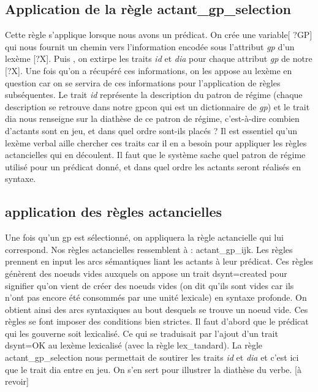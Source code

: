 \subsection{Application de la règle actant{\_}gp{\_}selection}
Cette règle s'applique lorsque nous avons un prédicat.
On crée une variable[ ?GP] qui nous fournit un chemin vers l'information encodée sous l'attribut \emph{ gp} d'un lexème [?X]. Puis , on extirpe les traits \emph{ id} et \emph{dia} pour chaque attribut\emph{ gp} de notre [?X]. Une fois qu'on a récupéré ces informations, on les appose au lexème en question car on se servira de ces informations pour l'application de règles subséquentes. Le trait \emph{ id} représente la description du patron de régime (chaque description se retrouve dans notre gpcon qui est un dictionnaire de\emph{ gp}) et le trait dia nous renseigne sur la diathèse de ce patron de régime, c'est-à-dire combien d'actants sont en jeu, et dans quel ordre sont-ils placés ? Il est essentiel qu'un lexème verbal aille chercher ces traits car il en a besoin pour appliquer les règles actancielles qui en découlent. Il faut que le système sache quel patron de régime utilisé pour un prédicat donné, et dans quel ordre les actants seront réalisés en syntaxe.

\subsection{application des règles actancielles}
Une fois qu'un gp est sélectionné, on appliquera la règle actancielle qui lui correspond. Nos règles actancielles ressemblent à : actant{\_}gp{\_}ijk. Les règles prennent en input les arcs sémantiques liant les actants à leur prédicat. Ces règles génèrent des noeuds vides auxquels on appose un trait dsynt=created pour signifier qu'on vient de créer des noeuds vides (on dit qu'ils sont vides car ils n'ont pas encore été consommés par une unité lexicale) en syntaxe profonde. On obtient ainsi des arcs syntaxiques au bout desquels se trouve un noeud vide. Ces règles se font imposer des conditions bien strictes. Il faut d'abord que le prédicat qui les gouverne soit lexicalisé. Ce qui se traduisait par l'ajout d'un trait dsynt=OK au lexème lexicalisé (avec la règle lex{\_}tandard). La règle actant{\_}gp{\_}selection nous permettait de soutirer les traits  \emph{ id} et \emph{dia} et c'est ici que le trait dia entre en jeu. On s'en sert pour illustrer la diathèse du verbe. [à revoir]


